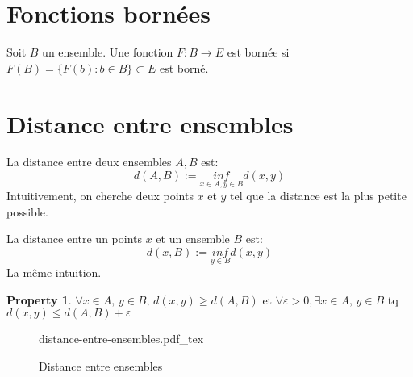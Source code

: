 \documentclass[a4paper]{report}
\let\epsilon\varepsilon
\theoremstyle{definition}
\newtheorem*{property}{Property}
\newcommand{\incfig}[1]{%
    \def\svgwidth{\columnwidth}
    {#1.pdf_tex}
}
\begin{document}
\section{Fonctions bornées}
\begin{definition}
    Soit $B$ un ensemble. Une fonction  $F: B \to E$ est bornée si $F(B) = \{ F(b): b \in B\} \subset E$ est borné.
\end{definition}
\section{Distance entre ensembles}
\begin{definition}
    La distance entre deux ensembles $A, B$ est:
     \[
         d(A, B) := \underset{x \in A, y \in B}{inf}d(x, y)
    \] 
    Intuitivement, on cherche deux points $x$ et  $y$ tel que la distance est la plus petite possible.
\end{definition}
\begin{definition}
    La distance entre un points $x$ et un ensemble  $B$ est:
     \[
         d(x, B) := \underset{y \in B}{inf}d(x, y)
    \] 
    La même intuition.
\end{definition}
\begin{property}
   $\forall x \in A, \, y \in B, \, d(x, y) \ge d(A, B)$ et $\forall \epsilon > 0, \exists x \in A, \, y \in B$ tq $d(x, y) \le d(A, B) + \epsilon$
\end{property}
\begin{figure}[H]
    \centering
    \incfig{distance-entre-ensembles}
    \caption{Distance entre ensembles}
    \label{fig:distance-entre-ensembles}
\end{figure}
\end{document}
